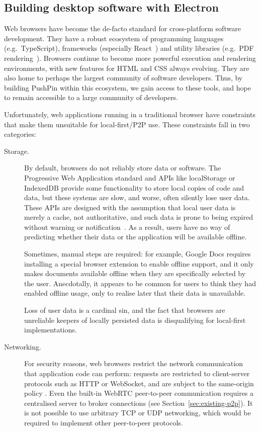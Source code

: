 \documentclass[sigplan,10pt]{acmart}
\begin{document}
\subsection{Building desktop software with Electron}

Web browsers have become the de-facto standard for cross-platform software development. They have a robust ecosystem of programming languages (e.g.\ TypeScript), frameworks (especially React~\cite{React}) and utility libraries (e.g.\ PDF rendering~\cite{PDFjs}). Browsers continue to become more powerful execution and rendering environments, with new features for HTML and CSS always evolving. They are also home to perhaps the largest community of software developers. Thus, by building PushPin within this ecosystem, we gain access to these tools, and hope to remain accessible to a large community of developers.

Unfortunately, web applications running in a traditional browser have constraints that make them unsuitable for local-first/P2P use. These constraints fall in two categories:

\begin{description}

\item[Storage.]
By default, browsers do not reliably store data or software. The Progressive Web Application standard and APIs like localStorage or IndexedDB provide some functionality to store local copies of code and data, but these systems are slow, and worse, often silently lose user data. These APIs are designed with the assumption that local user data is merely a cache, not authoritative, and such data is prone to being expired without warning or notification~\cite{LocalStorageCleared}.
As a result, users have no way of predicting whether their data or the application will be available offline.

Sometimes, manual steps are required: for example, Google Docs requires installing a special browser extension to enable offline support, and it only makes documents available offline when they are specifically selected by the user. Anecdotally, it appears to be common for users to think they had enabled offline usage, only to realise later that their data is unavailable.

Loss of user data is a cardinal sin, and the fact that browsers are unreliable keepers of locally persisted data is disqualifying for local-first implementations.

\item[Networking.]
For security reasons, web browsers restrict the network communication that application code can perform: requests are restricted to client-server protocols such as HTTP or WebSocket, and are subject to the same-origin policy \cite{SameOrigin}. Even the built-in WebRTC peer-to-peer communication requires a centralised server to broker connections (see Section~\ref{sec:existing-p2p}). It is not possible to use arbitrary TCP or UDP networking, which would be required to implement other peer-to-peer protocols.
\end{description}
\end{document}
